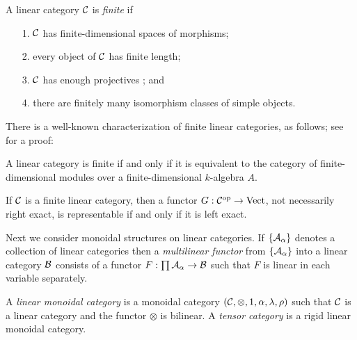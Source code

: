 \documentclass{amsart}
\begin{document}
\begin{definition} %
	A linear category $\mathcal C$ is {\em finite} if 
	\begin{enumerate}
		\item[1.] $\mathcal C$ has finite-dimensional spaces of morphisms;
		\item[2.] every object of $\mathcal C$ has finite length;
		\item[3.] $\mathcal C$ has enough projectives%
		; and
		\item[4.] there are finitely many isomorphism classes of simple objects.  
	\end{enumerate}
\end{definition}

There is a well-known characterization of finite linear categories, as follows; see~\cite{BTP} for a proof:
\begin{proposition}
A linear category is finite if and only if it is equivalent to the category of finite-dimensional modules over a finite-dimensional $k$-algebra $A$.
\end{proposition}

\begin{lemma} \label{lma:left_exact=linear}
	If $\mathcal C$ is a finite linear category, then a  functor $G: \mathcal C^{\mathrm{op}} \to \mathrm{Vect}$, not necessarily right exact, is representable if and only if it is left exact. 
\end{lemma}

	
Next we consider monoidal structures on linear categories.	
If $\{\mathcal A_\alpha\}$ denotes a collection of linear categories then a {\em multilinear functor} from $\{\mathcal A_\alpha\}$ into a linear category $\mathcal B$ consists of a functor
$F: \prod \mathcal A_\alpha \to \mathcal B$
such that $F$ is linear in each variable separately. 

\begin{definition}
	A {\em linear monoidal category} is a monoidal category $(\mathcal C, \otimes, 1, \alpha, \lambda, \rho)$ such that $\mathcal C$ is a linear category and the functor $\otimes$ is bilinear. A {\em tensor category} is a rigid linear monoidal category.  
\end{definition}
\end{document}
